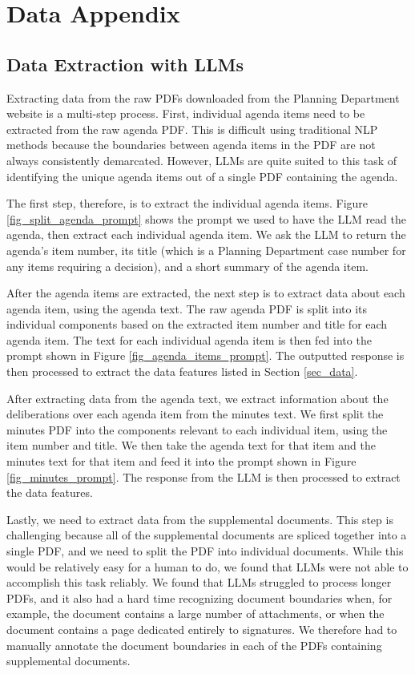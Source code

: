 \section{Data Appendix} \label{sec_data_appendix}

\subsection{Data Extraction with LLMs}

Extracting data from the raw PDFs downloaded from the Planning Department website is a multi-step process. First, individual agenda items need to be extracted from the raw agenda PDF. This is difficult using traditional NLP methods because the boundaries between agenda items in the PDF are not always consistently demarcated. However, LLMs are quite suited to this task of identifying the unique agenda items out of a single PDF containing the agenda.

The first step, therefore, is to extract the individual agenda items. Figure \ref{fig_split_agenda_prompt} shows the prompt we used to have the LLM read the agenda, then extract each individual agenda item. We ask the LLM to return the agenda's item number, its title (which is a Planning Department case number for any items requiring a decision), and a short summary of the agenda item.

After the agenda items are extracted, the next step is to extract data about each agenda item, using the agenda text. The raw agenda PDF is split into its individual components based on the extracted item number and title for each agenda item. The text for each individual agenda item is then fed into the prompt shown in Figure \ref{fig_agenda_items_prompt}. The outputted response is then processed to extract the data features listed in Section \ref{sec_data}.

After extracting data from the agenda text, we extract information about the deliberations over each agenda item from the minutes text. We first split the minutes PDF into the components relevant to each individual item, using the item number and title. We then take the agenda text for that item and the minutes text for that item and feed it into the prompt shown in Figure \ref{fig_minutes_prompt}. The response from the LLM is then processed to extract the data features.

Lastly, we need to extract data from the supplemental documents. This step is challenging because all of the supplemental documents are spliced together into a single PDF, and we need to split the PDF into individual documents. While this would be relatively easy for a human to do, we found that LLMs were not able to accomplish this task reliably. We found that LLMs struggled to process longer PDFs, and it also had a hard time recognizing document boundaries when, for example, the document contains a large number of attachments, or when the document contains a page dedicated entirely to signatures. We therefore had to manually annotate the document boundaries in each of the PDFs containing supplemental documents. 

